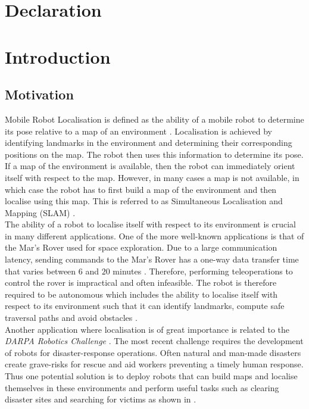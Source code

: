 \documentclass[11pt]{report}
\begin{document}
\chapter*{Declaration}
\label{sec:declaration}


\tableofcontents

\newpage

\listoffigures
\newpage

\listoftables
\newpage
\thispagestyle{plain}\pagestyle{plain}
\chapter{Introduction}
\label{sec:introduction}


\section{Motivation}
\label{sec:motivation}
Mobile Robot Localisation is defined as the ability of a mobile robot to determine its pose relative to a map of an environment \cite{Thrun2002}. Localisation is achieved by identifying landmarks in the environment and determining their corresponding positions on the map. The robot then uses this information to determine its pose. If a map of the environment is available, then the robot can immediately orient itself with respect to the map. However, in many cases a map is not available, in which case the robot has to first build a map of the environment and then localise using this map. This is referred to as Simultaneous Localisation and Mapping (SLAM) \cite{Durrant2006, Bailey2006b}.\\

The ability of a robot to localise itself with respect to its environment is crucial in many different applications. One of the more well-known applications is that of the Mar's Rover used for space exploration. Due to a large communication latency, sending commands to the Mar's Rover has a one-way data transfer time that varies between $6$ and $20$ minutes \cite{Powell2006}. Therefore, performing teleoperations to control the rover is impractical and often infeasible. The robot is therefore required to be autonomous which includes the ability to localise itself with respect to its environment such that it can identify landmarks, compute safe traversal paths and avoid obstacles \cite{Powell2006}.\\

Another application where localisation is of great importance is related to the \textit{DARPA Robotics Challenge} \cite{darpa2012}. The most recent challenge requires the development of robots for disaster-response operations. Often natural and man-made disasters create grave-risks for rescue and aid workers preventing a timely human response. Thus one potential solution is to deploy robots that can build maps and localise themselves in these environments and perform useful tasks such as clearing disaster sites and searching for victims as shown in  \cite{darpa2012}.\\   
\end{document}
